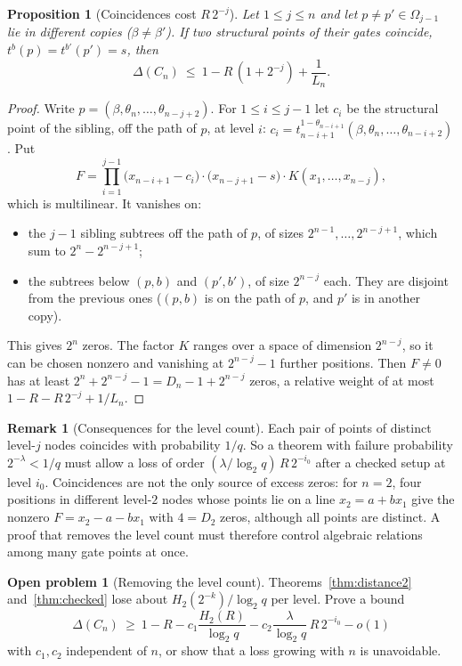 \documentclass[11pt]{article}
\newtheorem{proposition}[theorem]{Proposition}
\theoremstyle{definition}
\newtheorem{remark}[theorem]{Remark}
\newtheorem{problem}[theorem]{Open problem}
\begin{document}
\begin{proposition}[Coincidences cost $R\,2^{-j}$]\label{prop:coincidence}
Let $1\le j\le n$ and let $p\neq p'\in\Omega_{j-1}$ lie in different copies ($\beta\neq\beta'$). If
two structural points of their gates coincide, $t^b(p)=t^{b'}(p')=s$, then
\[
\Delta(C_n)\ \le\ 1-R\,(1+2^{-j})+\frac1{L_n}.
\]
\end{proposition}
\begin{proof}
Write $p=(\beta,\theta_n,\dots,\theta_{n-j+2})$. For $1\le i\le j-1$ let $c_i$ be the structural point
of the sibling, off the path of $p$, at level $i$: $c_i=t^{1-\theta_{n-i+1}}_{n-i+1}(\beta,\theta_n,\dots,\theta_{n-i+2})$. Put
\[
F=\prod_{i=1}^{j-1}\bigl(x_{n-i+1}-c_i\bigr)\cdot\bigl(x_{n-j+1}-s\bigr)\cdot K(x_1,\dots,x_{n-j}),
\]
which is multilinear. It vanishes on:
\begin{itemize}[leftmargin=*]
\item the $j-1$ sibling subtrees off the path of $p$, of sizes $2^{n-1},\dots,2^{n-j+1}$, which sum to $2^n-2^{n-j+1}$;
\item the subtrees below $(p,b)$ and $(p',b')$, of size $2^{n-j}$ each. They are disjoint from the
previous ones ($(p,b)$ is on the path of $p$, and $p'$ is in another copy).
\end{itemize}
This gives $2^n$ zeros. The factor $K$ ranges over a space of dimension $2^{n-j}$, so it can be chosen
nonzero and vanishing at $2^{n-j}-1$ further positions. Then $F\neq0$ has at least
$2^n+2^{n-j}-1=D_n-1+2^{n-j}$ zeros, a relative weight of at most $1-R-R\,2^{-j}+1/L_n$.
\end{proof}

\begin{remark}[Consequences for the level count]
Each pair of points of distinct level-$j$ nodes coincides with probability $1/q$. So a theorem with
failure probability $2^{-\lambda}<1/q$ must allow a loss of order $(\lambda/\log_2q)\,R\,2^{-i_0}$ after a
checked setup at level $i_0$. Coincidences are not the only source of excess zeros: for $n=2$, four
positions in different level-$2$ nodes whose points lie on a line $x_2=a+bx_1$ give the nonzero
$F=x_2-a-bx_1$ with $4=D_2$ zeros, although all points are distinct. A proof that removes the
level count must therefore control algebraic relations among many gate points at once.
\end{remark}

\begin{problem}[Removing the level count]\label{prob:levelcount}
Theorems~\ref{thm:distance2} and~\ref{thm:checked} lose about $H_2(2^{-k})/\log_2q$ per level. Prove a bound
\[
\Delta(C_n)\ \ge\ 1-R-c_1\frac{H_2(R)}{\log_2q}-c_2\frac{\lambda}{\log_2q}\,R\,2^{-i_0}-o(1)
\]
with $c_1,c_2$ independent of $n$, or show that a loss growing with $n$ is unavoidable.
\end{problem}
\end{document}

